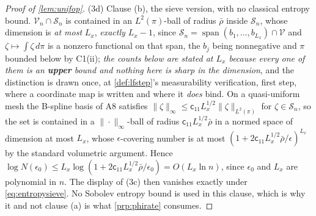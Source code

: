 \begin{proof}[Proof of \cref{lem:unifop}]
(3d) Clause (b), the sieve version, with no classical entropy bound.
$\mathcal V_n\cap\mathcal S_n$ is contained in an $L^{2}(\pi)$-ball of radius $\bar\rho$ inside
$\mathcal S_n$, whose dimension is \emph{at most} $L_x$, \emph{exactly $L_x-1$}, since
$\mathcal S_n=\operatorname{span}(b_1,\dots,b_{L_x})\cap\mathcal V$ and $\zeta\mapsto\int\zeta\,d\pi$ is a
nonzero functional on that span, the $b_j$ being nonnegative and $\pi$ bounded below by C1(ii); \emph{the counts below are stated at $L_x$
because every one of them is an \textbf{upper} bound and nothing here is sharp in the dimension}, and the
distinction is drawn once, at \cref{def:lfstep}'s measurability verification, first step, where a coordinate map is written and where
it \emph{does} bind. On a quasi-uniform mesh the B-spline basis of A8 satisfies
$\|\zeta\|_\infty\le\mathsf c_{11}L_x^{1/2}\|\zeta\|_{L^{2}(\pi)}$ for $\zeta\in\mathcal S_n$, so the set
is contained in a $\|\cdot\|_\infty$-ball of radius $\mathsf c_{11}L_x^{1/2}\bar\rho$ in a normed space of
dimension at most $L_x$, whose $\epsilon$-covering number is at most
$(1+2\mathsf c_{11}L_x^{1/2}\bar\rho/\epsilon)^{L_x}$ by the standard volumetric argument. Hence
$\log N(\epsilon_0)\le L_x\log(1+2\mathsf c_{11}L_x^{1/2}\bar\rho/\epsilon_0)=O(L_x\ln n)$, since
$\epsilon_0$ and $L_x$ are polynomial in $n$. The display of (3c) then vanishes exactly under
\eqref{eq:entropysieve}. No Sobolev entropy bound is used in this clause, which is why it and not
clause (a) is what \cref{prp:phirate} consumes.


\end{proof}
